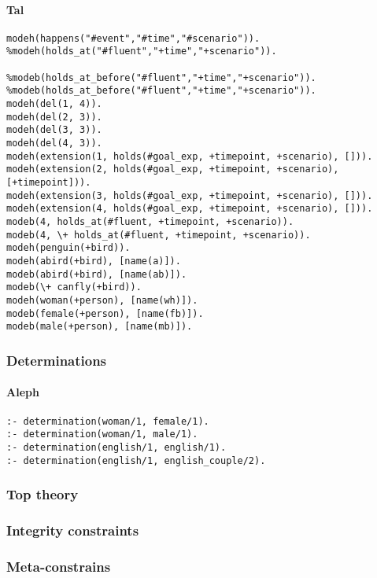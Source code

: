 \paragraph{Tal}
\begin{lstlisting}
modeh(happens("#event","#time","#scenario")).
%modeh(holds_at("#fluent","+time","+scenario")).

%modeb(holds_at_before("#fluent","+time","+scenario")).
%modeb(holds_at_before("#fluent","+time","+scenario")).
modeh(del(1, 4)).
modeh(del(2, 3)).
modeh(del(3, 3)).
modeh(del(4, 3)).
modeh(extension(1, holds(#goal_exp, +timepoint, +scenario), [])). 
modeh(extension(2, holds(#goal_exp, +timepoint, +scenario), [+timepoint])). 
modeh(extension(3, holds(#goal_exp, +timepoint, +scenario), [])). 
modeh(extension(4, holds(#goal_exp, +timepoint, +scenario), [])). 
modeb(4, holds_at(#fluent, +timepoint, +scenario)).
modeb(4, \+ holds_at(#fluent, +timepoint, +scenario)).
modeh(penguin(+bird)).  
modeh(abird(+bird), [name(a)]).
modeb(abird(+bird), [name(ab)]).
modeb(\+ canfly(+bird)).
modeh(woman(+person), [name(wh)]).
modeb(female(+person), [name(fb)]).
modeb(male(+person), [name(mb)]).
\end{lstlisting}

\subsubsection{Determinations}

\paragraph{Aleph}
\begin{lstlisting}
:- determination(woman/1, female/1).
:- determination(woman/1, male/1).
:- determination(english/1, english/1).
:- determination(english/1, english_couple/2).
\end{lstlisting}

\subsubsection{Top theory}

\subsubsection{Integrity constraints}

\subsubsection{Meta-constrains}

